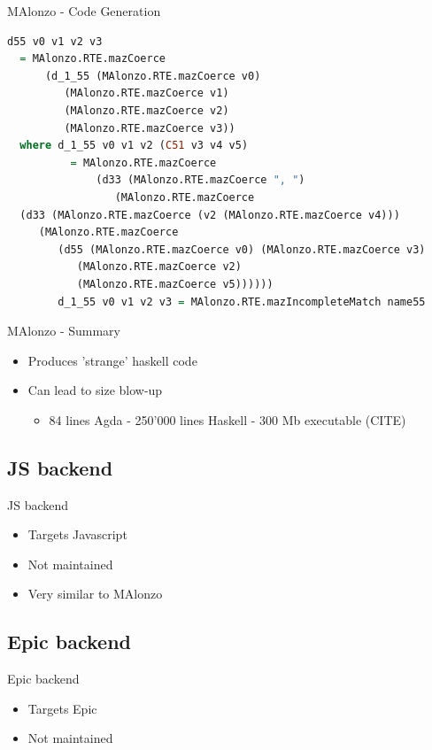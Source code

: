 \begin{frame}[fragile]{MAlonzo - Code Generation}
\begin{lstlisting}[language=Haskell,basicstyle=\scriptsize]
d55 v0 v1 v2 v3
  = MAlonzo.RTE.mazCoerce
      (d_1_55 (MAlonzo.RTE.mazCoerce v0)
         (MAlonzo.RTE.mazCoerce v1)
         (MAlonzo.RTE.mazCoerce v2)
         (MAlonzo.RTE.mazCoerce v3))
  where d_1_55 v0 v1 v2 (C51 v3 v4 v5)
          = MAlonzo.RTE.mazCoerce
              (d33 (MAlonzo.RTE.mazCoerce ", ")
                 (MAlonzo.RTE.mazCoerce
  (d33 (MAlonzo.RTE.mazCoerce (v2 (MAlonzo.RTE.mazCoerce v4)))
     (MAlonzo.RTE.mazCoerce
        (d55 (MAlonzo.RTE.mazCoerce v0) (MAlonzo.RTE.mazCoerce v3)
           (MAlonzo.RTE.mazCoerce v2)
           (MAlonzo.RTE.mazCoerce v5))))))
        d_1_55 v0 v1 v2 v3 = MAlonzo.RTE.mazIncompleteMatch name55
\end{lstlisting}
\end{frame}

\begin{frame}{MAlonzo - Summary}
\begin{itemize}
  \item Produces 'strange' haskell code
  \item Can lead to size blow-up
  \begin {itemize}
    \item 84 lines Agda - 250'000 lines Haskell - 300 Mb executable (CITE)
  \end{itemize}
\end{itemize}
\end{frame}

\subsection{JS backend}
\begin{frame}{JS backend}
\begin{itemize}
\item Targets Javascript
\item Not maintained
\item Very similar to MAlonzo
\end{itemize}
\end{frame}

\subsection{Epic backend}
\begin{frame}{Epic backend}
\begin{itemize}
\item Targets Epic
\item Not maintained
\end{itemize}
\end{frame}

